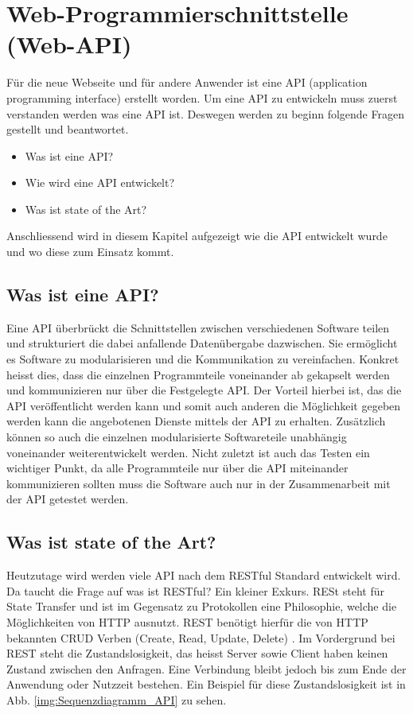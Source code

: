 \section{ Web-Programmierschnittstelle (Web-API)}
Für die neue Webseite und für andere Anwender ist eine API (application programming interface) erstellt worden. Um eine API zu entwickeln muss zuerst verstanden werden was eine API ist. Deswegen werden zu beginn folgende Fragen gestellt und beantwortet.
\begin{itemize}
\item Was ist eine API?
\item Wie wird eine API entwickelt?
\item Was ist state of the Art?
\end{itemize}

Anschliessend wird in diesem Kapitel aufgezeigt wie die API entwickelt wurde und wo diese zum Einsatz kommt.

\subsection{Was ist eine API?}
Eine API überbrückt die Schnittstellen zwischen verschiedenen Software teilen und strukturiert die dabei anfallende Datenübergabe dazwischen. Sie ermöglicht es Software zu modularisieren und die Kommunikation zu vereinfachen. Konkret heisst dies, dass die einzelnen Programmteile  voneinander ab gekapselt werden und kommunizieren nur über die Festgelegte API. Der Vorteil hierbei ist, das die API veröffentlicht werden kann und somit auch anderen die Möglichkeit gegeben werden kann die angebotenen Dienste mittels der API zu erhalten. Zusätzlich können so auch die einzelnen modularisierte Softwareteile unabhängig voneinander weiterentwickelt werden. Nicht zuletzt ist auch das Testen ein wichtiger Punkt, da alle Programmteile nur über die API miteinander kommunizieren sollten muss die Software auch nur in der Zusammenarbeit mit der API getestet werden.

\subsection{Was ist state of the Art?}
Heutzutage wird werden viele API nach dem RESTful Standard entwickelt wird. Da taucht die Frage auf was ist RESTful? Ein kleiner Exkurs. RESt steht für State Transfer und ist im Gegensatz zu Protokollen eine Philosophie, welche die Möglichkeiten von HTTP ausnutzt. REST benötigt hierfür die von HTTP bekannten CRUD Verben (Create, Read, Update, Delete) \cite{LornaJaneMitchell2013oreilly}. Im Vordergrund bei REST steht die Zustandslosigkeit, das heisst Server sowie Client haben keinen Zustand zwischen den Anfragen. Eine Verbindung bleibt jedoch bis zum Ende der Anwendung oder Nutzzeit bestehen. Ein Beispiel für diese Zustandslosigkeit ist in Abb. \ref{img:Sequenzdiagramm_API} zu sehen.\\

